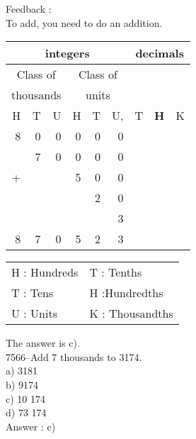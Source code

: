 \documentclass[letterpaper, 12pt]{article}
\begin{document}
Feedback :\\
To add, you need to do an addition.
\begin{center}
\begin{tabular}{|rrr|rrr|rrr|}
\hline
\multicolumn{6}{|c|}{integers} &\multicolumn{3}{|c|}{decimals} \\
\hline
\multicolumn{3}{|c|}{Class of} &\multicolumn{3}{|c|}{Class of} &  \multicolumn{3}{c|}{} \\
\multicolumn{3}{|c|}{thousands} &\multicolumn{3}{|c|}{units} &  \multicolumn{3}{c|}{} \\
\hline
H & T & U &H & T & U, & T\up{th} & \textbf{H\up{th}} & K\up{th} \\
\hline
\hline
8 & 0 & 0 & 0 & 0 & 0 &  & &\\
 & 7 & 0 & 0 & 0 & 0 &  & &\\
+ &  &  & 5 & 0 & 0 &  & &\\
 &  &  &  & 2 & 0 &  & &\\
 &  &  &  &  & 3 &  & &\\
\hline
\hline
 8 & 7 & 0 & 5 & 2 & 3 &  & &
\\
\hline
\end{tabular}
\end{center}

\scriptsize
\begin{center}
\begin{tabular}{ll}
H : Hundreds & T\up{th} : Tenths\\
T : Tens & H\up{th} :Hundredths\\
U : Units & K\up{e} : Thousandths\\
\end{tabular}
\end{center}

\normalsize
The answer is c).\\




7566--Add 7 thousands to 3174.\\

a) 3181\\
b) 9174\\
c) 10 174\\
d) 73 174\\

Answer : c)\\
\end{document}
